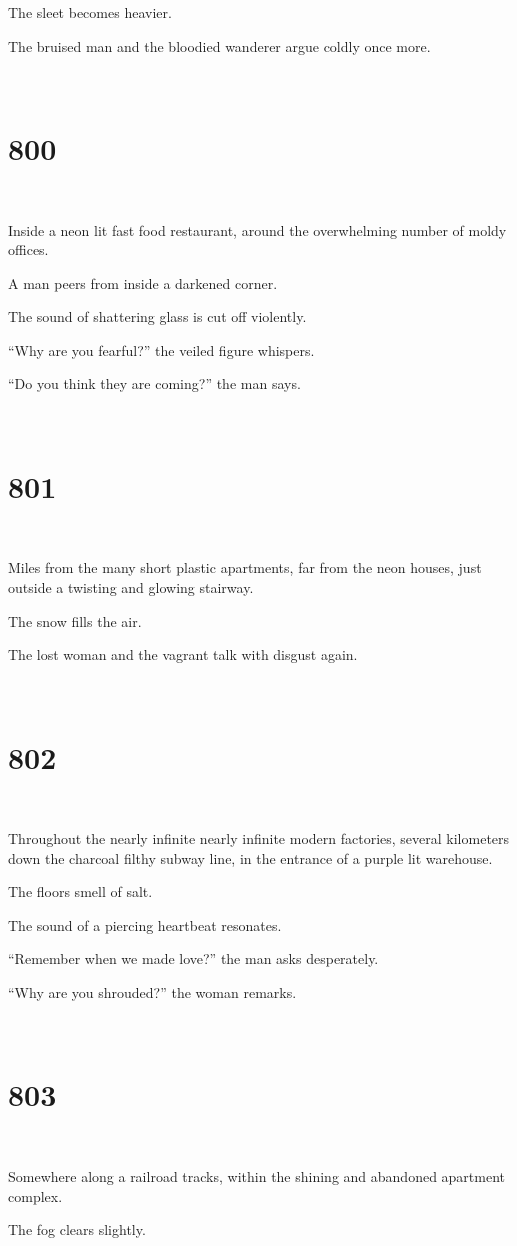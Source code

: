 \documentclass{report}
\begin{document}
The sleet becomes heavier.

The bruised man and the bloodied wanderer argue coldly once more.

~
\chapter*{800}
~

Inside a neon lit fast food restaurant, around the overwhelming number of moldy offices.

A man peers from inside a darkened corner.

The sound of shattering glass is cut off violently.

``Why are you fearful?'' the veiled figure whispers.

``Do you think they are coming?'' the man says.

~
\chapter*{801}
~

Miles from the many short plastic apartments, far from the neon houses, just outside a twisting and glowing stairway.

The snow fills the air.

The lost woman and the vagrant talk with disgust again.

~
\chapter*{802}
~

Throughout the nearly infinite nearly infinite modern factories, several kilometers down the charcoal filthy subway line, in the entrance of a purple lit warehouse.

The floors smell of salt.

The sound of a piercing heartbeat resonates.

``Remember when we made love?'' the man asks desperately.

``Why are you shrouded?'' the woman remarks.

~
\chapter*{803}
~

Somewhere along a railroad tracks, within the shining and abandoned apartment complex.

The fog clears slightly.
\end{document}
